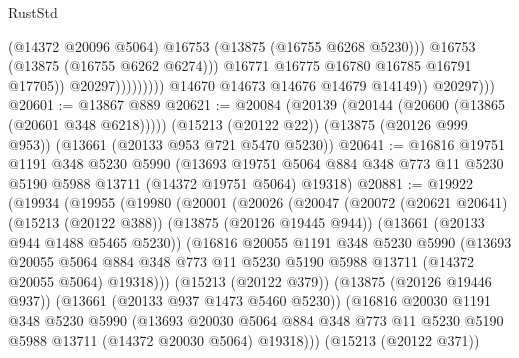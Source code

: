 \begin{lexlean}{RustStd}
\begin{coremodule}
                                        (@14372 @20096 @5064)
                                        @16753
                                        (@13875 (@16755 @6268 @5230)))
                                      @16753
                                      (@13875 (@16755 @6262 @6274)))
                                    @16771
                                    @16775
                                    @16780
                                    @16785
                                    @16791
                                    @17705))
                                @20297)))))))))
              @14670
              @14673
              @14676
              @14679
              @14149))
          @20297)))
@20601 := @13867 @889
@20621 := @20084
    (@20139 (@20144 (@20600 (@13865 (@20601 @348 @6218)))))
    (@15213 (@20122 @22))
    (@13875 (@20126 @999 @953))
    (@13661 (@20133 @953 @721 @5470 @5230))
@20641 := @16816
    @19751
    @1191
    @348
    @5230
    @5990
    (@13693 @19751 @5064 @884 @348 @773 @11 @5230 @5190 @5988 @13711 (@14372 @19751 @5064) @19318)
@20881 := @19922
    (@19934
      (@19955
        (@19980
          (@20001
            (@20026
              (@20047
                (@20072
                  (@20621 @20641)
                  (@15213 (@20122 @388))
                  (@13875 (@20126 @19445 @944))
                  (@13661 (@20133 @944 @1488 @5465 @5230))
                  (@16816
                    @20055
                    @1191
                    @348
                    @5230
                    @5990
                    (@13693
                      @20055
                      @5064
                      @884
                      @348
                      @773
                      @11
                      @5230
                      @5190
                      @5988
                      @13711
                      (@14372 @20055 @5064)
                      @19318)))
                (@15213 (@20122 @379))
                (@13875 (@20126 @19446 @937))
                (@13661 (@20133 @937 @1473 @5460 @5230))
                (@16816
                  @20030
                  @1191
                  @348
                  @5230
                  @5990
                  (@13693
                    @20030
                    @5064
                    @884
                    @348
                    @773
                    @11
                    @5230
                    @5190
                    @5988
                    @13711
                    (@14372 @20030 @5064)
                    @19318)))
              (@15213 (@20122 @371))

\end{coremodule}
\end{lexlean}
